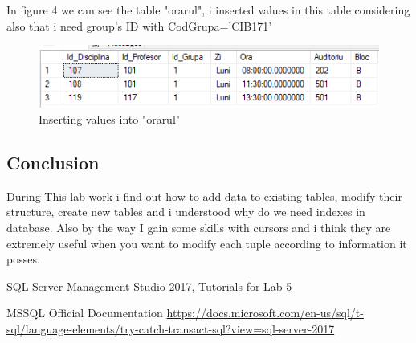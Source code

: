 \documentclass[12pt]{article}
\begin{document}
        In figure 4 we can see the table "orarul", i inserted values in this table considering also that i need group's ID with CodGrupa='CIB171'
        \begin{figure}[H]
                \centering
                \includegraphics[width=.8\textwidth]{img6.png}
                \caption{Inserting values into "orarul"}
        \end{figure}
        \vspace{0.5 cm}

   
        \newpage 
        \subsection*{Conclusion}
        During This lab work i find out how to add data to existing tables, modify their structure, create new tables and i understood why do we need indexes in database. Also by the way I gain some skills with cursors and i think they are extremely useful when you want to modify each tuple according to information it posses. 
        \cite{SQLServerManagementStudio}
        

 
\medskip
 
\begin{thebibliography}{9}
SQL Server Management Studio 2017, Tutorials for Lab 5

MSSQL Official Documentation
\url{https://docs.microsoft.com/en-us/sql/t-sql/language-elements/try-catch-transact-sql?view=sql-server-2017}
\end{thebibliography}
                
\end{document}
